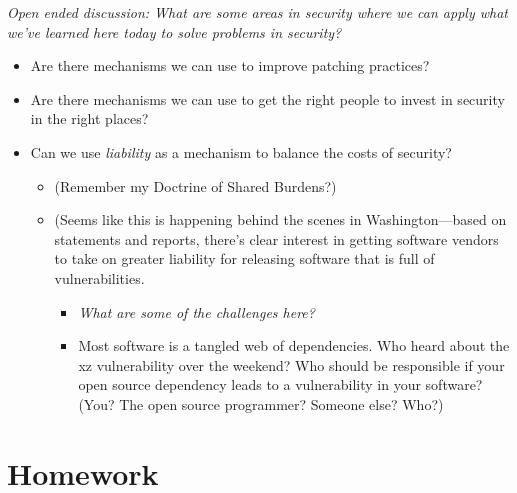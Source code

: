\documentclass[11pt]{article}
\begin{document}
{\it Open ended discussion: What are some areas in security where we can apply what we've learned here today to solve problems in security?}
\begin{itemize}
    \item Are there mechanisms we can use to improve patching practices?
    \item Are there mechanisms we can use to get the right people to invest in security in the right places?
    \item Can we use {\it liability} as a mechanism to balance the costs of security?
    \begin{itemize}
        \item (Remember my Doctrine of Shared Burdens?)
        \item (Seems like this is happening behind the scenes in Washington---based on statements and reports, there's clear interest in getting software vendors to take on greater liability for releasing software that is full of vulnerabilities. 
        \begin{itemize}
            \item {\it What are some of the challenges here?}
            \item Most software is a tangled web of dependencies. Who heard about the xz vulnerability over the weekend? Who should be responsible if your open source dependency leads to a vulnerability in your software? (You? The open source programmer? Someone else? Who?)
        \end{itemize}
    \end{itemize}
\end{itemize}


\section{Homework}
\end{document}
